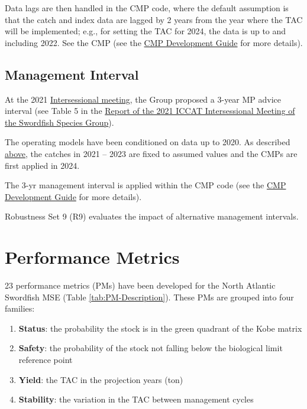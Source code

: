 \documentclass[
]{article}
\begin{document}
Data lags are then handled in the CMP code, where the default assumption is that the catch and index data are lagged by 2 years from the year where the TAC will be implemented; e.g., for setting the TAC for 2024, the data is up to and including 2022. See the CMP (see the \href{../cMPdevelopment/CMP-Development-Guide.html}{CMP Development Guide} for more details).

\hypertarget{interval}{%
\subsection{Management Interval}\label{interval}}

At the 2021 \href{/Meeting_Reports/2021_SWO_ENG.pdf}{Intersessional meeting}, the Group proposed a 3-year MP advice interval (see Table 5 in the \href{../Meeting_Reports//2021_SWO_ENG.pdf}{Report of the 2021 ICCAT Intersessional Meeting of the Swordfish Species Group}).

The operating models have been conditioned on data up to 2020. As described \protect\hyperlink{future-catches}{above}, the catches in 2021 -- 2023 are fixed to assumed values and the CMPs are first applied in 2024.

The 3-yr management interval is applied within the CMP code (see the \href{../cMPdevelopment/CMP-Development-Guide.html}{CMP Development Guide} for more details).

Robustness Set 9 (R9) evaluates the impact of alternative management intervals.

\hypertarget{performance-metrics}{%
\section{Performance Metrics}\label{performance-metrics}}

23 performance metrics (PMs) have been developed for the North Atlantic Swordfish MSE (Table \ref{tab:PM-Description}). These PMs are grouped into four families:

\begin{enumerate}
\def\labelenumi{\arabic{enumi}.}
\item
  \textbf{Status}: the probability the stock is in the green quadrant of the Kobe matrix
\item
  \textbf{Safety}: the probability of the stock not falling below the biological limit reference point
\item
  \textbf{Yield}: the TAC in the projection years (ton)
\item
  \textbf{Stability}: the variation in the TAC between management cycles
\end{enumerate}
\end{document}
